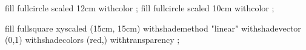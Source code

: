 \definecolor [trans] [a=multiply, t=.5, g=.5]

\startMPpage
    fill fullcircle scaled 12cm withcolor ;
    fill fullcircle scaled 10cm withcolor ;

    fill fullsquare xyscaled (15cm, 15cm)
      withshademethod "linear"
      withshadevector (0,1)
      withshadecolors (red,)
      withtransparency 
    ;

\stopMPpage
